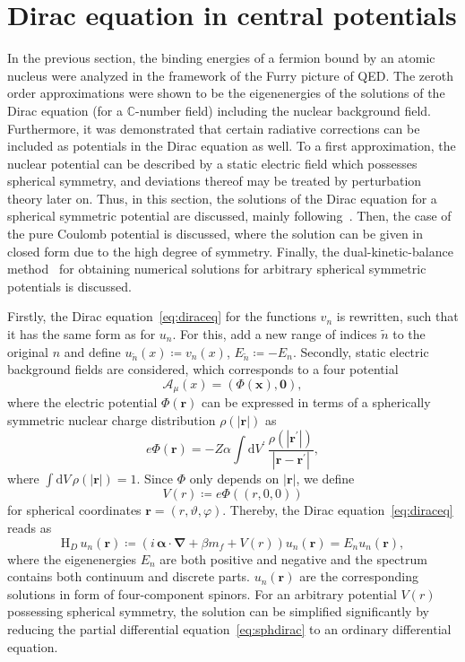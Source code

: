\section{Dirac equation in central potentials}
\label{sec:sph_dirac}
In the previous section, the binding energies of a fermion bound by an atomic nucleus were analyzed in the framework of the Furry picture of QED. The zeroth order approximations were shown to be the eigenenergies of the solutions of the Dirac equation (for a \mbox{$\mathbb{C}$-number} field) including the nuclear background field. Furthermore, it was demonstrated that certain radiative corrections can be included as potentials in the Dirac equation as well. To a first approximation, the nuclear potential can be described by a static electric field which possesses spherical symmetry, and deviations thereof may be treated by perturbation theory later on. Thus, in this section, the solutions of the Dirac equation for a spherical symmetric potential are discussed, mainly following~\cite{greiner2000, weinberg2005}. Then, the case of the pure Coulomb potential is discussed, where the solution can be given in closed form due to the high degree of symmetry. Finally, the dual-kinetic-balance method~\cite{Shabaev2004} for obtaining numerical solutions for arbitrary spherical symmetric potentials is discussed.

Firstly, the Dirac equation~\eqref{eq:diraceq} for the functions $v_n$ is rewritten, such that it has the same form as for $u_n$. For this, add a new range of indices $\tilde{n}$ to the original $n$ and define $u_{\tilde{n}}(x)\coloneqq v_n(x)$, $E_{\tilde{n}}\coloneqq -E_n$. Secondly, static electric background fields are considered, which corresponds to a four potential
\begin{equation}
\mathcal{A}_\mu(x)=(\Phi(\mathbf{x}),\mathbf{0}),
\end{equation}
where the electric potential $\Phi(\mathbf{r})$ can be expressed in terms of a spherically symmetric nuclear charge distribution $\rho(\mathbf{|r|})$ as
\begin{equation}
\label{eq:furry_elPot}
e\Phi(\mathbf{r})=-Z\alpha\int\mathrm{d}V^{\prime}\,\frac{\rho(|\mathbf{r^{\prime}}|)}{|\mathbf{r}-\mathbf{r^{\prime}}|},
\end{equation}
where $\int \mathrm{d}V\,\rho(|\mathbf{r}|)=1$. Since $\Phi$ only depends on $|\mathbf{r}|$, we define $$V(r)\coloneqq e\Phi((r,0,0))\label{eq:FSpot}$$ for spherical coordinates $\mathbf{r}=(r,\vartheta,\varphi)$. Thereby, the Dirac equation~\eqref{eq:diraceq} reads as
\begin{equation}
\text{H}_D \, u_n(\mathbf{r})\coloneqq\left( i\,\pmb{\alpha} \cdot \mathbf{\nabla} + \beta m_f + V(r) \right) u_n(\mathbf{r}) =  E_n u_n(\mathbf{r}),
\label{eq:sphdirac}
\end{equation}
where the eigenenergies $E_n$ are both positive and negative and the spectrum contains both continuum and discrete parts. $u_n(\mathbf{r})$ are the corresponding solutions in form of four-component spinors. For an arbitrary potential $V(r)$ possessing spherical symmetry, the solution can be simplified significantly by reducing the partial differential equation~\eqref{eq:sphdirac} to an ordinary differential equation.

